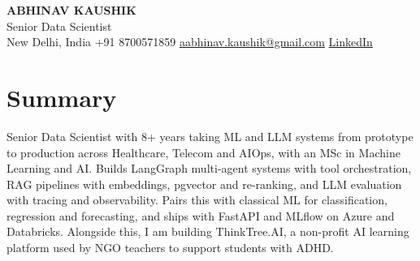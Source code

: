 \documentclass[10pt,a4paper]{article}
\begin{document}
\begin{center}
  {\LARGE\bfseries ABHINAV KAUSHIK}\\[2pt]
  {\large Senior Data Scientist}\\[2pt]
  New Delhi, India \textbar{} +91 8700571859 \textbar{} \href{mailto:aabhinav.kaushik@gmail.com}{aabhinav.kaushik@gmail.com} \textbar{} \href{https://www.linkedin.com/in/abhinav-kaushik10/}{LinkedIn}  
\end{center}

\section{Summary}
Senior Data Scientist with 8+ years taking ML and LLM systems from prototype to production across Healthcare, Telecom and AIOps, with an MSc in Machine Learning and AI. Builds LangGraph multi-agent systems with tool orchestration, RAG pipelines with embeddings, pgvector and re-ranking, and LLM evaluation with tracing and observability. Pairs this with classical ML for classification, regression and forecasting, and ships with FastAPI and MLflow on Azure and Databricks. Alongside this, I am building ThinkTree.AI, a non-profit AI learning platform used by NGO teachers to support students with ADHD.
\end{document}
